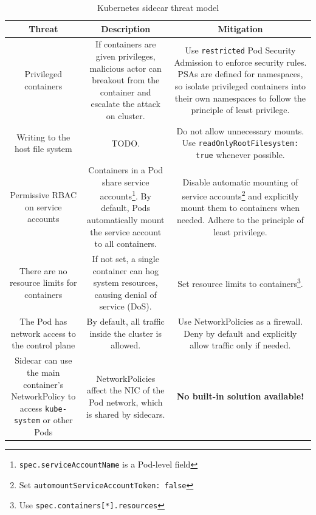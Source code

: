 \documentclass[english, 12pt, a4paper, sci, utf8, a-2b, online]{aaltothesis}
\begin{document}
\begin{table}[H]
  \sffamily%
  \centering

  \caption{Kubernetes sidecar threat model}
  \label{table:threat-model}

  \begin{minipage}{\textwidth}
  \renewcommand{\thempfootnote}{\arabic{mpfootnote}}
  \begin{tabularx}{\textwidth}{CCC}
    \hline
    \textbf{Threat} & \textbf{Description} & \textbf{Mitigation}\\ \hline
    Privileged containers & If containers are given privileges, malicious actor can breakout from the container and escalate the attack on cluster. & Use \texttt{restricted} Pod Security Admission to enforce security rules. PSAs are defined for namespaces, so isolate privileged containers into their own namespaces to follow the principle of least privilege. \\ \hline
    Writing to the host file system & TODO. & Do not allow unnecessary mounts. Use \texttt{readOnlyRootFilesystem: true} whenever possible. \\ \hline
    Permissive RBAC on service accounts & Containers in a Pod share service accounts\footnote{\texttt{spec.serviceAccountName} is a Pod-level field}. By default, Pods automatically mount the service account to all containers. & Disable automatic mounting of service accounts\footnote{Set \texttt{automountServiceAccountToken: false}} and explicitly mount them to containers when needed. Adhere to the principle of least privilege. \\ \hline
    There are no resource limits for containers & If not set, a single container can hog system resources, causing denial of service (DoS). & Set resource limits to containers\footnote{Use \texttt{spec.containers[*].resources}}. \\ \hline
    The Pod has network access to the control plane & By default, all traffic inside the cluster is allowed. & Use NetworkPolicies as a firewall. Deny by default and explicitly allow traffic only if needed. \\ \hline
    Sidecar can use the main container's NetworkPolicy to access \texttt{kube-system} or other Pods & NetworkPolicies affect the NIC of the Pod network, which is shared by sidecars. & \textbf{No built-in solution available!} \\ \hline

\end{tabularx}
\end{minipage}
\end{table}
\end{document}
